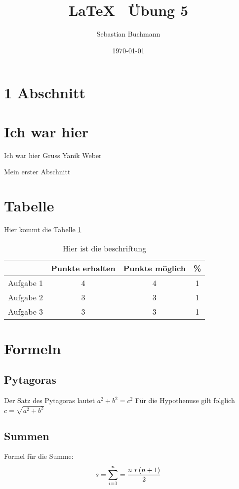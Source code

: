\documentclass[11pt,a4paper]{article}
\date{\today}
\author{Sebastian Buchmann}
\title{ \LaTeX ~ Übung 5}
\begin{document}
\maketitle
\section{1 Abschnitt}
\section{Ich war hier}

Ich war hier Gruss Yanik Weber 


Mein erster Abschnitt


\section{Tabelle}
Hier kommt die Tabelle \ref{tab:Punkte}
\begin{table} [h]
\centering
\begin{tabular} {c|c|c|c} 

{} & {Punkte erhalten}  & {Punkte möglich} & {\%}   \\
\hline

Aufgabe 1 & 4 & 4 & 1 \\
Aufgabe 2 & 3 & 3 & 1 \\
Aufgabe 3 & 3 & 3 & 1 \\


\end{tabular}

\caption{Hier ist die beschriftung}
\label{tab:Punkte}
\end{table}
\section{Formeln}

\subsection{Pytagoras}
 Der Satz des Pytagoras lautet $ a^2 + b^2 = c^2$ Für die Hypothenuse gilt folglich $c = \sqrt{a^2+b^2}$
 
\subsection{Summen}

Formel für die Summe: \\
\begin{equation}
 s= \sum\limits_{i=1}^{n} = \frac{n*(n+1)}{2}   
\centering
\end{equation}
\end{document}

